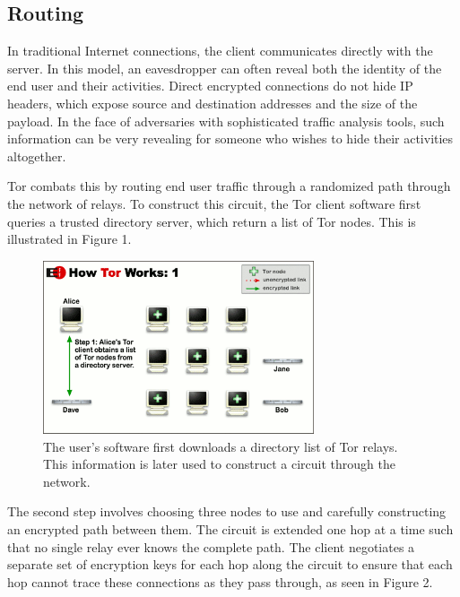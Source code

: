 \documentclass[journal]{IEEEtran}
\begin{document}
\subsection{Routing}

In traditional Internet connections, the client communicates directly with the server. In this model, an eavesdropper can often reveal both the identity of the end user and their activities. Direct encrypted connections do not hide IP headers, which expose source and destination addresses and the size of the payload. In the face of adversaries with sophisticated traffic analysis tools, such information can be very revealing for someone who wishes to hide their activities altogether.

Tor combats this by routing end user traffic through a randomized path through the network of relays. To construct this circuit, the Tor client software first queries a trusted directory server, which return a list of Tor nodes. This is illustrated in Figure 1.

\begin{figure}[htbp]
\centering
\begin{minipage}{8 cm}
    \includegraphics[width=80mm]{resources/circuit-building-1.png}
    \caption{The user's software first downloads a directory list of Tor relays. This information is later used to construct a circuit through the network.\cite{McCoy2008}\cite{TorOverview}}
\end{minipage}
\end{figure}

The second step involves choosing three nodes to use and carefully constructing an encrypted path between them. The circuit is extended one hop at a time such that no single relay ever knows the complete path. The client negotiates a separate set of encryption keys for each hop along the circuit to ensure that each hop cannot trace these connections as they pass through, as seen in Figure 2.
\end{document}
